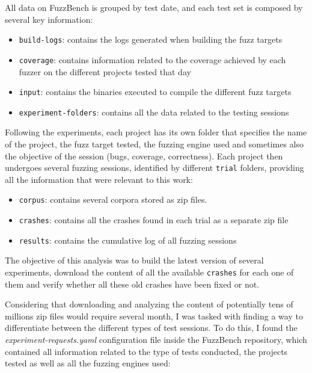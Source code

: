 All data on FuzzBench is grouped by test date, and each test set is composed by several key information:
\begin{itemize}
    \item \verb|build-logs|: contains the logs generated when building the fuzz targets
    \item \verb|coverage|: contains information related to the coverage achieved by each fuzzer on the different projects tested that day
    \item \verb|input|: contains the binaries executed to compile the different fuzz targets
    \item \verb|experiment-folders|: contains all the data related to the testing sessions
\end{itemize}

Following the experiments, each project has its own folder that specifies the name of the project, the fuzz target tested, the fuzzing engine used and sometimes also the objective of the session (bugs, coverage, correctness). Each project then undergoes several fuzzing sessions, identified by different \verb|trial| folders, providing all the information that were relevant to this work:
\begin{itemize}
    \item \verb|corpus|: contains several corpora stored as zip files.
    \item \verb|crashes|: contains all the crashes found in each trial as a separate zip file
    \item \verb|results|: contains the cumulative log of all fuzzing sessions
\end{itemize}


The objective of this analysis was to build the latest version of several experiments, download the content of all the available \verb|crashes| for each one of them and verify whether all these old crashes have been fixed or not.

Considering that downloading and analyzing the content of potentially tens of millions zip files would require several month, I was tasked with finding a way to differentiate between the different types of test sessions.
To do this, I found the \textit{experiment-requests.yaml} configuration file \cite{exp_yaml} inside the FuzzBench repository, which contained
all information related to the type of tests conducted, the projects tested as well as all the fuzzing engines used:

